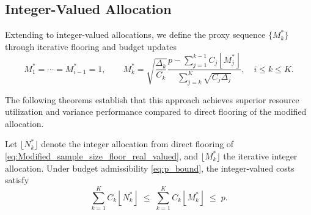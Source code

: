 \subsection{Integer-Valued Allocation}
Extending to integer-valued allocations, we define the proxy sequence $\{M_k^*\}$ through iterative flooring and budget updates
%
\begin{equation}
    \label{eq:Modified_sample_size_iterative_integer_proxy}
    M_1^*=\cdots=M_{i-1}^*=1, \qquad 
    M_k^*=\sqrt{\frac{\Delta_k}{C_k}}
    \frac{p-\sum_{j=1}^{k-1} C_j\left\lfloor M_j^*\right\rfloor}
         {\sum_{j=k}^{K}\sqrt{C_j\Delta_j}}, \quad i\le k\le K.
\end{equation}
%

The following theorems establish that this approach achieves superior resource utilization and variance performance compared to direct flooring of the modified allocation.


\begin{theorem}
\label{thm:MFMC_modified_integer_cost}
Let $\lfloor N_k^* \rfloor$ denote the integer allocation from direct flooring of \eqref{eq:Modified_sample_size_floor_real_valued}, and $\lfloor M_k^* \rfloor$ the iterative integer allocation. Under budget admissibility \eqref{eq:p_bound}, the integer-valued costs satisfy
\[
\sum_{k=1}^K C_k \left\lfloor N_k^* \right\rfloor\;\le\; \sum_{k=1}^K C_k\left\lfloor M_k^* \right\rfloor \;\le\; p.
\]
\end{theorem}




